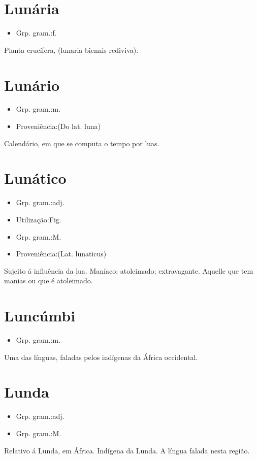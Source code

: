 \section{Lunária}
\begin{itemize}
\item {Grp. gram.:f.}
\end{itemize}
Planta crucífera, (\textunderscore lunaria biennis rediviva\textunderscore ).
\section{Lunário}
\begin{itemize}
\item {Grp. gram.:m.}
\end{itemize}
\begin{itemize}
\item {Proveniência:(Do lat. \textunderscore luna\textunderscore )}
\end{itemize}
Calendário, em que se computa o tempo por luas.
\section{Lunático}
\begin{itemize}
\item {Grp. gram.:adj.}
\end{itemize}
\begin{itemize}
\item {Utilização:Fig.}
\end{itemize}
\begin{itemize}
\item {Grp. gram.:M.}
\end{itemize}
\begin{itemize}
\item {Proveniência:(Lat. \textunderscore lunaticus\textunderscore )}
\end{itemize}
Sujeito á influência da lua.
Maníaco; atoleimado; extravagante.
Aquelle que tem manias ou que é atoleimado.
\section{Luncúmbi}
\begin{itemize}
\item {Grp. gram.:m.}
\end{itemize}
Uma das línguas, faladas pelos indígenas da África occidental.
\section{Lunda}
\begin{itemize}
\item {Grp. gram.:adj.}
\end{itemize}
\begin{itemize}
\item {Grp. gram.:M.}
\end{itemize}
Relativo á Lunda, em África.
Indígena da Lunda.
A língua falada nesta região.

